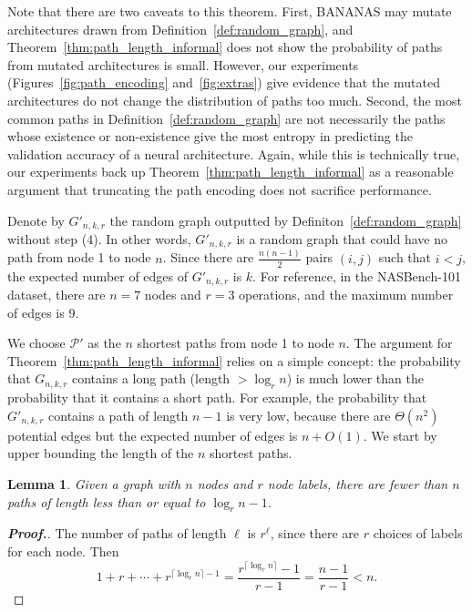 \documentclass[11pt]{article}
\numberwithin{equation}{section}
\numberwithin{figure}{section}
\theoremstyle{plain}
\newtheorem{lemma}[theorem]{Lemma}
\theoremstyle{definition}
\begin{document}
Note that there are two caveats to this theorem.
First, BANANAS may mutate architectures drawn from 
Definition~\ref{def:random_graph}, and Theorem~\ref{thm:path_length_informal}
does not show the probability of paths from mutated architectures is small.
However, our experiments (Figures~\ref{fig:path_encoding} and~\ref{fig:extras})
give evidence that
the mutated architectures do not change the distribution of paths too much.
Second, the most common paths in Definition~\ref{def:random_graph} are not necessarily
the paths whose existence or non-existence give the most entropy in predicting the validation
accuracy of a neural architecture. Again, while this is technically true, our experiments
back up Theorem~\ref{thm:path_length_informal} as a reasonable argument
that truncating the path encoding does not sacrifice performance.


Denote by $G'_{n, k, r}$ the random graph outputted by
Definiton~\ref{def:random_graph} without step (4).
In other words, $G'_{n, k, r}$ is a random graph that
could have no path from node 1 to node $n$.
Since there are $\frac{n(n-1)}{2}$ pairs $(i,j)$ such that
$i<j$, the expected number of edges of $G'_{n, k, r}$ is $k$.
For reference, in the NASBench-101 dataset, there are $n=7$ nodes
and $r=3$ operations, and the maximum number of edges is 9.


We choose $\mathcal{P}'$ as the $n$ shortest paths
from node 1 to node $n$.
The argument for Theorem~\ref{thm:path_length_informal}
relies on a simple concept:
the probability that $G_{n,k,r}$ contains a
long path (length $>\log_r n$) 
is much lower than the probability that it contains a short path.
For example, the probability that
$G'_{n,k,r}$ contains a path of length $n-1$
is very low,
because there are $\Theta(n^2)$ potential edges 
but the expected number of edges is $n+O(1)$.
We start by upper bounding the length of the $n$ shortest paths.

\begin{lemma} \label{lem:path_length}
Given a graph with $n$ nodes and $r$ node labels, 
there are fewer than $n$ paths of length 
less than or equal to $\log_r n - 1$.
\end{lemma}

\begin{proof}[\textbf{Proof.}]
The number of paths of length $\ell$ is $r^\ell$, since there
are $r$ choices of labels for each node.
Then
\begin{equation*}
1+r+\cdots+r^{\lceil\log_r n\rceil - 1}
=\frac{ r^{\lceil\log_r n\rceil}-1}{r-1}=\frac{n-1}{r-1}<n.
\end{equation*}
\end{proof}
\end{document}
